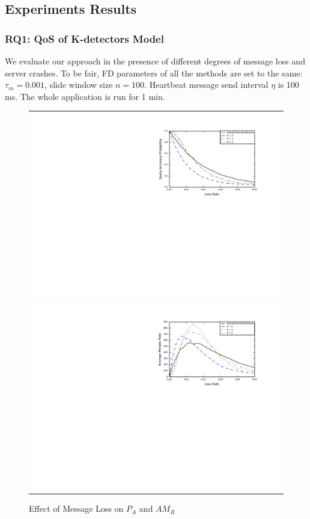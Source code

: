 \documentclass{sig-alternate-05-2015}
\begin{document}
\subsection{Experiments Results}

\subsubsection*{RQ1: QoS of K-detectors Model}
\quad We evaluate our approach in the presence of different degrees of message loss and server crashes. To be fair, FD parameters of all the methods are set to the same: $\tau_m=0.001$, slide window size $n=100$. Heartbeat message send interval $\eta$ is 100 ms. The whole application is run for 1 min.

\begin{figure}
  \centering
  \begin{tabular}{c}
  \includegraphics[scale=0.7]{r1} \\
  \includegraphics[scale=0.7]{r2}
  \end{tabular}
  \caption{Effect of Message Loss on $P_A$ and $AM_R$}
\end{figure}
\end{document}
